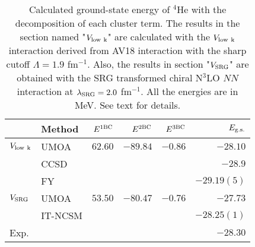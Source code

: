 \documentclass[aps,prc, dvips, twocolumn,groupedaddress,showkeys,showpacs,floatfix,superscriptaddress]{revtex4-1}
\newcommand{\<}{\langle}
\renewcommand{\>}{\rangle}
\begin{document}
\begin{table}[b!]
  \caption{\label{tab_energy}Calculated ground-state energy of ${}^4$He with the decomposition of each cluster term.
The results in the section named "$V_{\rm low \ k}$" are calculated with the $V_{\rm low \ k}$ interaction
    derived from AV18 interaction with the sharp cutoff $\Lambda = 1.9$ fm$^{-1}$.
Also, the results in section "$V_{\rm SRG}$" are obtained with the SRG transformed chiral N$^{3}$LO $NN$ interaction
    at $\lambda_{\rm SRG} = 2.0$ fm$^{-1}$.
  All the energies are in MeV. See text for details.}
 \begin{ruledtabular}
  \begin{tabular}{llrrrr}
    &    Method                &      $E^{{\rm 1BC}} $   &     $E^{{\rm 2BC}}$   &     $E^{{\rm 3BC}}$   &   $E_{\rm g.s.}$ \\ \hline
$V_{\rm low \ k}$ &  UMOA    &    $62.60$  &  $-89.84$  & $-0.86$   & $-28.10$       \\
             & CCSD \cite{Hagen:2007}    &      &                               &                             &  $-28.9$      \\
             & FY \cite{Nogga:2004,Hagen:2007}      &    &        &   &  $-29.19(5)$ \\
$V_{\rm SRG}$ & UMOA    &    $53.50$  & $-80.47$ & $-0.76$ & $-27.73$         \\
             & IT-NCSM \cite{Roth:2011}    &     &                               &                             &     $-28.25(1)$   \\
    Exp.\cite{Wang:2012}       & & & & & $-28.30$ \\
  \end{tabular}
 \end{ruledtabular}
\end{table}
\end{document}
